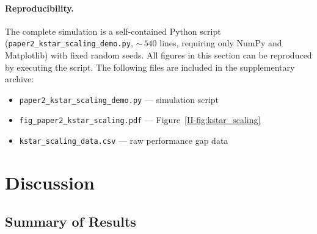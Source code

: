 \documentclass[12pt,a4paper,openany]{book}
\begin{document}
\paragraph{Reproducibility.}
\begin{sloppypar}
The complete simulation is a self-contained Python script
(\texttt{paper2\_kstar\_scaling\_demo.py}, ${\sim}\,540$
lines, requiring only NumPy and Matplotlib) with fixed
random seeds.  All figures in this section can be
reproduced by executing the script.  The following files
are included in the supplementary archive:
\begin{itemize}
\item \texttt{paper2\_kstar\_scaling\_demo.py} --- simulation script
\item \texttt{fig\_paper2\_kstar\_scaling.pdf} --- Figure~\ref{II-fig:kstar_scaling}
\item \texttt{kstar\_scaling\_data.csv} --- raw performance gap data
\end{itemize}
\end{sloppypar}

\section{Discussion}
\label{II-sec:discussion}

\subsection{Summary of Results}
\label{II-subsec:summary}
\end{document}
